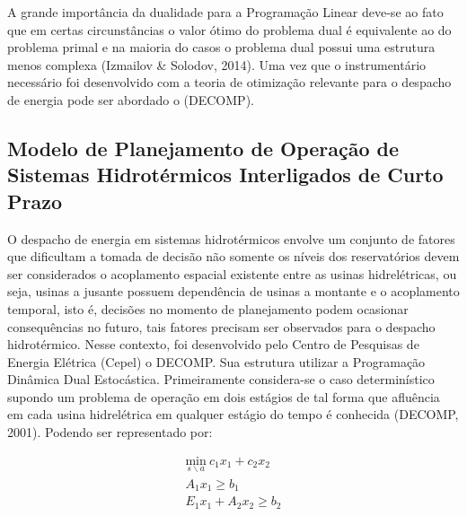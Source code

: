 \documentclass[12pt,fleqn]{article}
\begin{document}
A grande import\^ancia da dualidade para a Programa\c c\~ao Linear deve-se ao fato que em certas circunst\^ancias o valor \'otimo do problema dual \'e equivalente ao do
problema primal e na maioria do casos o problema dual possui uma estrutura menos complexa (Izmailov \& Solodov, 2014). Uma
vez que o instrument\'ario necess\'ario foi desenvolvido com a teoria de otimiza\c c\~ao relevante para o despacho de
energia pode ser abordado o (DECOMP). 

\subsection{Modelo de Planejamento de Opera\c c\~ao de Sistemas Hidrot\'ermicos Interligados de Curto Prazo}
O despacho de energia em sistemas hidrot\'ermicos envolve um conjunto de fatores que dificultam a tomada de decis\~ao
n\~ao somente os n\'iveis dos reservat\'orios devem ser considerados o acoplamento espacial existente entre as usinas
hidrel\'etricas, ou seja, usinas a jusante possuem depend\^encia de usinas a montante e o acoplamento temporal, isto
\'e,
decis\~oes no momento de planejamento podem ocasionar consequ\^encias no futuro, tais fatores  precisam ser observados para
o despacho hidrot\'ermico.
Nesse contexto, foi desenvolvido pelo Centro de Pesquisas de Energia El\'etrica (Cepel) o DECOMP. Sua estrutura
utilizar a Programa\c c\~ao Din\^amica Dual Estoc\'astica. Primeiramente considera-se o caso determin\'istico supondo um problema de opera\c
c\~ao em dois est\'agios de tal forma que 
aflu\^encia em cada usina hidrel\'etrica em qualquer est\'agio do tempo \'e conhecida (DECOMP, 2001). Podendo ser representado por:

\begin{equation}
  \begin{aligned}
	\underset {s \backslash a} {\text{min}}  \ c_1x_1 + c_2x_2 \\
	A_1 x_1 \geq b_1 \\
	E_1 x_1 + A_2 x_2 \geq b_2
	\label{p1}
  \end{aligned}
\end{equation}
\end{document}
